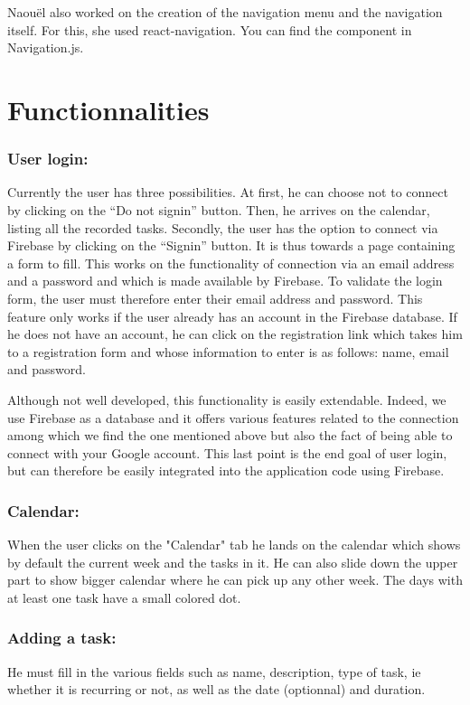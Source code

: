 \documentclass[a4paper,12pt]{article}
\begin{document}
\bigskip
Naouël also worked on the creation of the navigation menu and the navigation itself. For this, she used react-navigation. You can find the component in Navigation.js.

\bigskip
\section*{Functionnalities}
\subsubsection*{User login:}

\bigskip
Currently the user has three possibilities. At first, he can choose not to connect by clicking on the “Do not signin” button. Then, he arrives on the calendar, listing all the recorded tasks. Secondly, the user has the option to connect via Firebase by clicking on the “Signin” button. It is thus towards a page containing a form to fill. This works on the functionality of connection via an email address and a password and which is made available by Firebase. To validate the login form, the user must therefore enter their email address and password. This feature only works if the user already has an account in the Firebase database. If he does not have an account, he can click on the registration link which takes him to a registration form and whose information to enter is as follows: name, email and password.

\bigskip
Although not well developed, this functionality is easily extendable. Indeed, we use Firebase as a database and it offers various features related to the connection among which we find the one mentioned above but also the fact of being able to connect with your Google account. This last point is the end goal of user login, but can therefore be easily integrated into the application code using Firebase.

\bigskip
\subsubsection*{Calendar:}

\bigskip
When the user clicks on the "Calendar" tab he lands on the calendar which shows by default the current week and the tasks in it. He can also slide down the upper part to show bigger calendar where he can pick up any other week. The days with at least one task have a small colored dot.

\bigskip
\subsubsection*{Adding a task:}
He must fill in the various fields such as name, description, type of task, ie whether it is recurring or not, as well as the date (optionnal) and duration.
\end{document}
